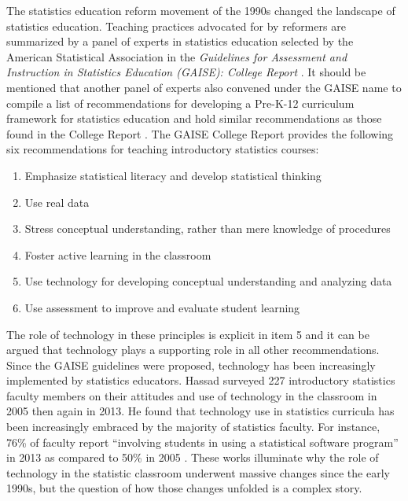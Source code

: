 \documentclass[11pt]{isuthesis}
\begin{document}
The statistics education reform movement of the 1990s changed the landscape of statistics education. Teaching practices advocated for by reformers are summarized by a panel of experts in statistics education selected by the American Statistical Association in the \textit{Guidelines for Assessment and Instruction in Statistics Education (GAISE): College Report} \citep{GAISEcollege}. It should be mentioned that another panel of experts also convened under the GAISE name to compile a list of recommendations for developing a Pre-K-12 curriculum framework for statistics education and hold similar recommendations as those found in the College Report \citep{GAISEk12}.  The GAISE College Report provides the following six recommendations for teaching introductory statistics courses:

\begin{enumerate}
\item Emphasize statistical literacy and develop statistical thinking
\item Use real data
\item Stress conceptual understanding, rather than mere knowledge of procedures
\item Foster active learning in the classroom 
\item Use technology for developing conceptual understanding and analyzing data
\item Use assessment to improve and evaluate student learning
\end{enumerate}

The role of technology in these principles is explicit in item 5 and it can be argued that technology plays a supporting role in all other recommendations. Since the GAISE guidelines were proposed, technology has been increasingly implemented by statistics educators. Hassad surveyed 227 introductory statistics faculty members on their attitudes and use of technology in the classroom in 2005 then again in 2013. He found that technology use in statistics curricula has been increasingly embraced by the majority of statistics faculty. For instance, 76\% of faculty report ``involving students in using a statistical software program'' in 2013 as compared to 50\% in 2005 \citep{Hassad2013}. These works illuminate why the role of technology in the statistic classroom underwent massive changes since the early 1990s, but the question of how those changes unfolded is a complex story.
\end{document}
